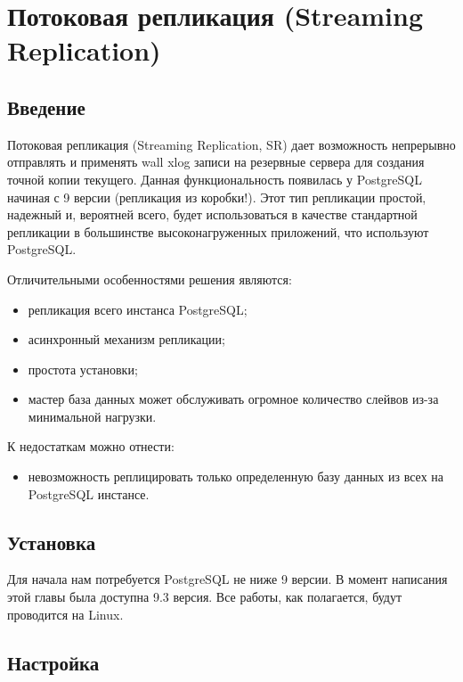 \section{Потоковая репликация (Streaming Replication)}

\subsection{Введение}

Потоковая репликация (Streaming Replication, SR) дает возможность непрерывно отправлять и применять wall xlog записи на резервные сервера для создания точной копии текущего. Данная функциональность появилась у PostgreSQL начиная с 9 версии (репликация из коробки!). Этот тип репликации простой, надежный и, вероятней всего, будет использоваться в качестве стандартной репликации в большинстве высоконагруженных приложений, что используют PostgreSQL.

Отличительными особенностями решения являются:

\begin{itemize}
  \item репликация всего инстанса PostgreSQL;
  \item асинхронный механизм репликации;
  \item простота установки;
  \item мастер база данных может обслуживать огромное количество слейвов из-за минимальной нагрузки.
\end{itemize}

К недостаткам можно отнести:

\begin{itemize}
  \item невозможность реплицировать только определенную базу данных из всех на PostgreSQL инстансе.
\end{itemize}

\subsection{Установка}

Для начала нам потребуется PostgreSQL не ниже 9 версии. В момент написания этой главы была доступна 9.3 версия. Все работы, как полагается, будут проводится на Linux.

\subsection{Настройка}

